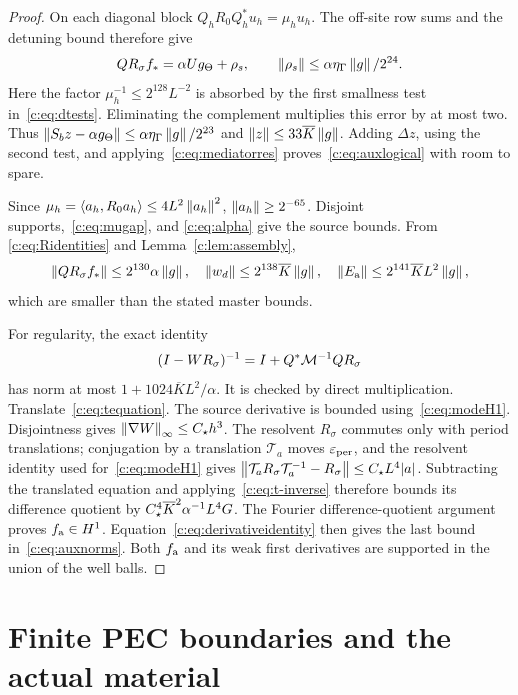 \begin{proof}
On each diagonal block $Q_hR_0Q_h^*u_h=\mu_hu_h$.
The off-site row sums and the detuning bound therefore give
\[
 QR_\sigma f_*=\alpha Ug_\Theta+\rho_s,
 \qquad\left\lVert \rho_s\right\rVert\le\alpha\eta_\Gamma\left\lVert g\right\rVert/2^{24}.
\]
Here the factor $\mu_h^{-1}\le2^{128}L^{-2}$ is absorbed by the first
smallness test in~\eqref{c:eq:dtests}. Eliminating the complement
multiplies this error by at most two. Thus
$\left\lVert S_bz-\alpha g_\Theta\right\rVert\le\alpha\eta_\Gamma\left\lVert g\right\rVert/2^{23}$ and
$\left\lVert z\right\rVert\le33\overline K\left\lVert g\right\rVert$. Adding $\Delta z$, using the second test, and
applying~\eqref{c:eq:mediatorres} proves~\eqref{c:eq:auxlogical} with
room to spare.

Since $\mu_h=\left\langle a_h,R_0a_h\right\rangle\le4L^2\left\lVert a_h\right\rVert^2$,
$\left\lVert a_h\right\rVert\ge2^{-65}$. Disjoint supports,~\eqref{c:eq:mugap}, and
\eqref{c:eq:alpha} give the source bounds. From
\eqref{c:eq:Ridentities} and Lemma~\ref{c:lem:assembly},
\[
 \left\lVert QR_\sigma f_*\right\rVert\le2^{130}\alpha\left\lVert g\right\rVert,
 \quad\left\lVert w_d\right\rVert\le2^{138}\overline K\left\lVert g\right\rVert,
 \quad\left\lVert E_{\rm a}\right\rVert\le2^{141}\overline KL^2\left\lVert g\right\rVert,
\]
which are smaller than the stated master bounds.

For regularity, the exact identity
\begin{equation}
 (I-WR_\sigma)^{-1}=I+Q^*\mathcal M^{-1}QR_\sigma            \label{c:eq:t-inverse}
\end{equation}
has norm at most $1+1024\overline KL^2/\alpha$. It is checked by direct
multiplication. Translate~\eqref{c:eq:tequation}. The source derivative
is bounded using~\eqref{c:eq:modeH1}. Disjointness gives
$\left\lVert \nabla W\right\rVert_\infty\le C_\star h^3$. The resolvent $R_\sigma$ commutes
only with period translations; conjugation by a translation $\mathcal T_a$ moves
$\varepsilon_{\rm per}$, and the resolvent identity used
for~\eqref{c:eq:modeH1} gives
$\left\lVert \mathcal T_aR_\sigma\mathcal T_a^{-1}-R_\sigma\right\rVert\le C_\star L^4|a|$.
Subtracting the translated equation and applying~\eqref{c:eq:t-inverse}
therefore bounds its difference quotient by
$C_\star^4\overline K^2\alpha^{-1}L^4G$. The Fourier difference-quotient argument
proves $f_{\rm a}\in H^1$. Equation~\eqref{c:eq:derivativeidentity} then gives
the last bound in~\eqref{c:eq:auxnorms}. Both $f_{\rm a}$ and its weak first
derivatives are supported in the union of the well balls.
\end{proof}

\section{Finite PEC boundaries and the actual material}
\label{c:sec:boundary}


